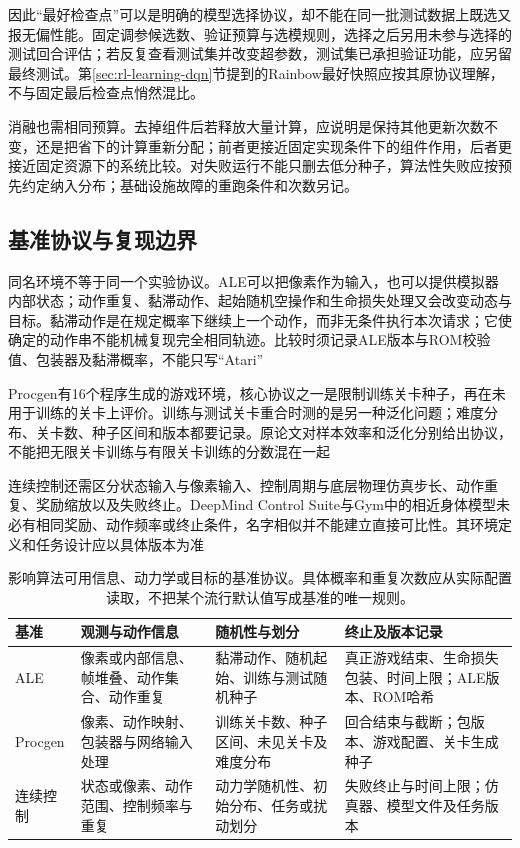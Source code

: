 因此“最好检查点”可以是明确的模型选择协议，却不能在同一批测试数据上既选又报无偏性能。固定调参候选数、验证预算与选模规则，选择之后另用未参与选择的测试回合评估；若反复查看测试集并改变超参数，测试集已承担验证功能，应另留最终测试。第\ref{sec:rl-learning-dqn}节提到的Rainbow最好快照应按其原协议理解，不与固定最后检查点悄然混比。

消融也需相同预算。去掉组件后若释放大量计算，应说明是保持其他更新次数不变，还是把省下的计算重新分配；前者更接近固定实现条件下的组件作用，后者更接近固定资源下的系统比较。对失败运行不能只删去低分种子，算法性失败应按预先约定纳入分布；基础设施故障的重跑条件和次数另记。

\subsection{基准协议与复现边界}
\label{sec:rl-learning-benchmark-protocol}

同名环境不等于同一个实验协议。ALE可以把像素作为输入，也可以提供模拟器内部状态；动作重复、黏滞动作、起始随机空操作和生命损失处理又会改变动态与目标。黏滞动作是在规定概率下继续上一个动作，而非无条件执行本次请求；它使确定的动作串不能机械复现完全相同轨迹。比较时须记录ALE版本与ROM校验值、包装器及黏滞概率，不能只写“Atari”

Procgen有16个程序生成的游戏环境，核心协议之一是限制训练关卡种子，再在未用于训练的关卡上评价。训练与测试关卡重合时测的是另一种泛化问题；难度分布、关卡数、种子区间和版本都要记录。原论文对样本效率和泛化分别给出协议，不能把无限关卡训练与有限关卡训练的分数混在一起

连续控制还需区分状态输入与像素输入、控制周期与底层物理仿真步长、动作重复、奖励缩放以及失败终止。DeepMind Control Suite与Gym中的相近身体模型未必有相同奖励、动作频率或终止条件，名字相似并不能建立直接可比性。其环境定义和任务设计应以具体版本为准

\begin{table}[t]
  \centering
  \small
  \begin{tabularx}{\linewidth}{>{\raggedright\arraybackslash}p{21mm} >{\raggedright\arraybackslash}X >{\raggedright\arraybackslash}X >{\raggedright\arraybackslash}X}
    \toprule
    基准 & 观测与动作信息 & 随机性与划分 & 终止及版本记录 \\
    \midrule
    ALE & 像素或内部信息、帧堆叠、动作集合、动作重复 & 黏滞动作、随机起始、训练与测试随机种子 & 真正游戏结束、生命损失包装、时间上限；ALE版本、ROM哈希 \\
    Procgen & 像素、动作映射、包装器与网络输入处理 & 训练关卡数、种子区间、未见关卡及难度分布 & 回合结束与截断；包版本、游戏配置、关卡生成种子 \\
    连续控制 & 状态或像素、动作范围、控制频率与重复 & 动力学随机性、初始分布、任务或扰动划分 & 失败终止与时间上限；仿真器、模型文件及任务版本 \\
    \bottomrule
  \end{tabularx}
  \caption{影响算法可用信息、动力学或目标的基准协议。具体概率和重复次数应从实际配置读取，不把某个流行默认值写成基准的唯一规则。}
  \label{tab:rl-learning-benchmark-settings}
\end{table}

